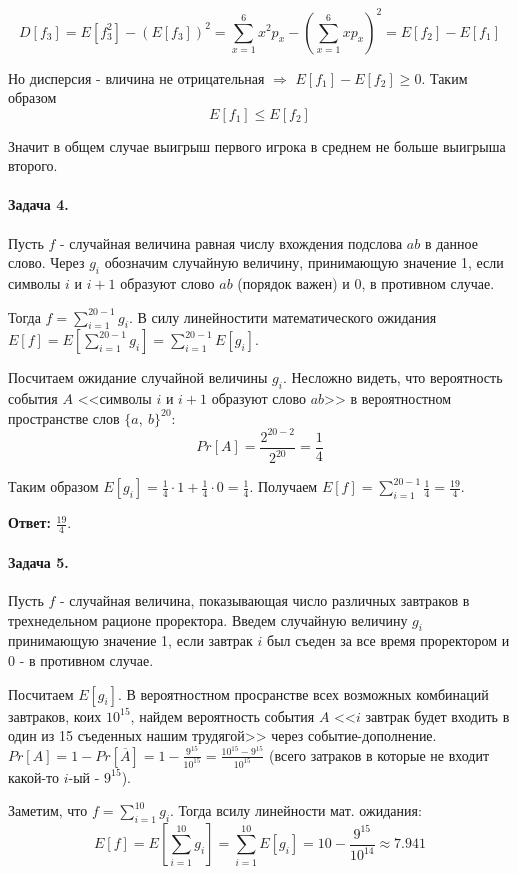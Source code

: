\documentclass{article}
\begin{document}
    $$D[f_3] = E[f_3^2] - (E[f_3])^2 = \sum_{x=1}^{6} x^2p_x - (\sum_{x=1}^{6} xp_x)^2 = E[f_2] - E[f_1]$$

    Но дисперсия - вличина не отрицательная $\Rightarrow$ $E[f_1] - E[f_2] \ge 0$. Таким образом 
     $$E[f_1] \le E[f_2]$$

    Значит в общем случае выигрыш первого игрока в среднем не больше выигрыша второго.


    \paragraph{Задача 4.}
    Пусть $f$ - случайная величина равная числу вхождения подслова $ab$ в данное слово. Через $g_i$ обозначим случайную величину, принимающую значение 1, если символы $i$ и $i + 1$ образуют слово $ab$ (порядок важен) и 0, в противном случае.

    Тогда $f = \sum_{i=1}^{20 - 1} g_i$. В силу линейностити математического ожидания $E[f] = E[\sum_{i=1}^{20 - 1} g_i] = \sum_{i=1}^{20 - 1} E[g_i]$. 

    Посчитаем ожидание случайной величины $g_i$. Несложно видеть, что вероятность события $A$ <<символы $i$ и $i + 1$ образуют слово $ab$>> в вероятностном пространстве слов $\{a,\ b\}^20$:
    $$Pr[A] = \frac{2^{20 - 2}}{2^{20}} = \frac{1}{4}$$

    Таким образом $E[g_i] = \frac{1}{4} \cdot 1 + \frac{1}{4} \cdot 0 = \frac{1}{4}$.
    Получаем $E[f] = \sum_{i=1}^{20 - 1} \frac{1}{4} = \frac{19}{4}$.

    \textbf{Ответ:} $\frac{19}{4}$.

    \paragraph{Задача 5.}
    Пусть $f$ - случайная величина, показывающая число различных завтраков в трехнедельном рационе проректора. Введем случайную величину $g_i$ принимающую значение 1, если завтрак $i$ был съеден за все время проректором и 0 - в противном случае.

    Посчитаем $E[g_i]$. В вероятностном просранстве всех возможных комбинаций завтраков, коих $10^{15}$, найдем вероятность события $A$ <<$i$ завтрак будет входить в один из 15 съеденных нашим трудягой>> через событие-дополнение. $Pr[A] = 1 - Pr[\overline{A}] = 1 - \frac{9^{15}}{10^{15}} = \frac{10^{15} - 9^{15}}{10^{15}}$ (всего затраков в которые не входит какой-то $i$-ый - $9^{15}$).

    Заметим, что $f = \sum_{i=1}^{10}g_i$. Тогда всилу линейности мат. ожидания:
    $$ E[f] = 
    E[\sum_{i=1}^{10} g_i] = \sum_{i=1}^{10} E[g_i] = 10 - \frac{9^{15}}{10^{14}} \approx 7.941 $$
\end{document}
